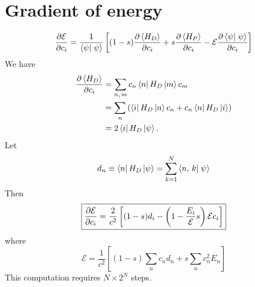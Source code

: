 \section*{Gradient of energy}
\begin{equation}
  \pd{\mathcal{E}}{c_i} = \frac{1}{\braket{\psi}{\psi}}
  \left[ (1-s) \pd{\avg{H_D}}{c_i} + s \pd{\avg{H_P}}{c_i}
  - \mathcal{E} \pd{\braket{\psi}{\psi}}{c_i} \right]
  \label{}
\end{equation}
We have
\begin{align}
  \pd{\avg{H_D}}{c_i}
  &= \sum_{n,\,m} c_n \matrixel{n}{H_D}{m} c_m \\
  &= \sum_n \left( \matrixel{i}{H_D}{n} c_n + c_n \matrixel{n}{H_D}{i} \right) \\
  &= 2 \matrixel{i}{H_D}{\psi}.
  \label{}
\end{align}
Let
\begin{equation}
  d_n
  \equiv \matrixel{n}{H_D}{\psi}
  = \sum_{k=1}^N \braket{\nghbr{n}{k}}{\psi}
  \label{}
\end{equation}
Then
\begin{equation}
  \boxed{
    \frac{\partial \mathcal{E}}{\partial c_i}
    = \frac{2}{c^2}
    \left[ (1-s) d_i -
      \left(1 - \frac{E_i}{\mathcal{E}} s \right)
      \mathcal{E} c_i
    \right]
  }
  \label{}
\end{equation}
where
\begin{equation}
  \boxed{
    \mathcal{E}
    = \frac{1}{c^2} \left[ (1-s) \sum_n c_n d_n + s \sum_n c_n^2 E_n \right]
  }
  \label{}
\end{equation}
This computation requires $N \times 2^N$ steps.



